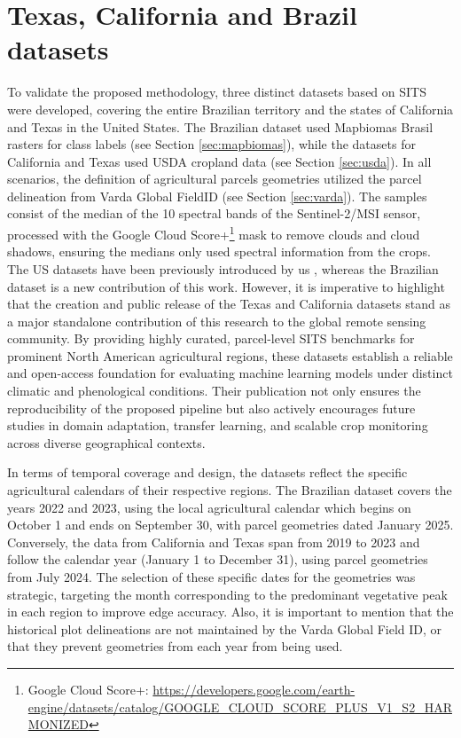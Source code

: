 \section{Texas, California and Brazil datasets}
\label{sec:datasets_overview}

To validate the proposed methodology, three distinct datasets based on \ac{SITS} were developed, covering the entire Brazilian territory and the states of California and Texas in the United States. The Brazilian dataset used  Mapbiomas Brasil rasters for class labels (see Section \ref{sec:mapbiomas}), while the datasets for California and Texas used \ac{USDA} cropland data (see Section \ref{sec:usda}). In all scenarios, the definition of agricultural parcels geometries utilized the parcel delineation from Varda Global FieldID (see Section \ref{sec:varda}). The samples consist of the median of the 10 spectral bands of the Sentinel-2/MSI sensor, processed with the Google Cloud Score+\footnote{Google Cloud Score+: \url{https://developers.google.com/earth-engine/datasets/catalog/GOOGLE_CLOUD_SCORE_PLUS_V1_S2_HARMONIZED}} mask to remove clouds and cloud shadows, ensuring the medians only used spectral information from the crops. The US datasets have been previously introduced by us \citep{pintodasilva2025lightweight}, whereas the Brazilian dataset is a new contribution of this work. However, it is imperative to highlight that the creation and public release of the Texas and California datasets stand as a major standalone contribution of this research to the global remote sensing community. By providing highly curated, parcel-level \ac{SITS} benchmarks for prominent North American agricultural regions, these datasets establish a reliable and open-access foundation for evaluating machine learning models under distinct climatic and phenological conditions. Their publication not only ensures the reproducibility of the proposed pipeline but also actively encourages future studies in domain adaptation, transfer learning, and scalable crop monitoring across diverse geographical contexts.

In terms of temporal coverage and design, the datasets reflect the specific agricultural calendars of their respective regions. The Brazilian dataset covers the years 2022 and 2023, using the local agricultural calendar which begins on October 1 and ends on September 30, with parcel geometries dated January 2025. Conversely, the data from California and Texas span from 2019 to 2023 and follow the calendar year (January 1 to December 31), using parcel geometries from July 2024. The selection of these specific dates for the geometries was strategic, targeting the month corresponding to the predominant vegetative peak in each region to improve edge accuracy. Also, it is important to mention that the historical plot delineations are not maintained by the Varda Global Field ID, or that they prevent geometries from each year from being used.

